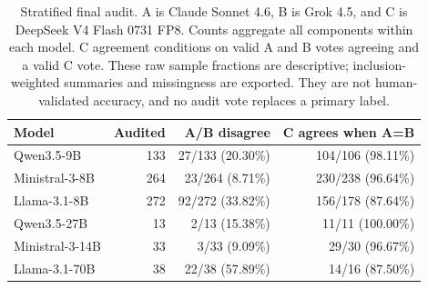 \begin{table}[t]
\centering\scriptsize\setlength{\tabcolsep}{3pt}
\begin{tabular}{lrrr}
\toprule
Model & Audited & A/B disagree & C agrees when A=B \\
\midrule
Qwen3.5-9B & 133 & 27/133 (20.30\%) & 104/106 (98.11\%) \\
Ministral-3-8B & 264 & 23/264 (8.71\%) & 230/238 (96.64\%) \\
Llama-3.1-8B & 272 & 92/272 (33.82\%) & 156/178 (87.64\%) \\
Qwen3.5-27B & 13 & 2/13 (15.38\%) & 11/11 (100.00\%) \\
Ministral-3-14B & 33 & 3/33 (9.09\%) & 29/30 (96.67\%) \\
Llama-3.1-70B & 38 & 22/38 (57.89\%) & 14/16 (87.50\%) \\
\bottomrule
\end{tabular}
\caption{Stratified final audit. A is Claude Sonnet 4.6, B is Grok 4.5, and C is DeepSeek V4 Flash 0731 FP8. Counts aggregate all components within each model. C agreement conditions on valid A and B votes agreeing and a valid C vote. These raw sample fractions are descriptive; inclusion-weighted summaries and missingness are exported. They are not human-validated accuracy, and no audit vote replaces a primary label.}
\label{tab:current-judge-audit}
\end{table}
